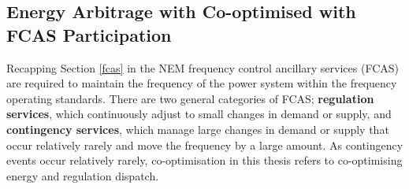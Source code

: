 \subsection{ Energy Arbitrage with Co-optimised with FCAS Participation }
Recapping Section \ref{fcas} in the NEM frequency control ancillary services (FCAS) are required to maintain the frequency of the power system within the frequency operating standards. There are two general categories of FCAS; \textbf{regulation services}, which continuously adjust to small changes in demand or supply, and \textbf{contingency services}, which manage large changes in demand or supply that occur relatively rarely and move the frequency by a large amount.
As contingency events occur relatively rarely, co-optimisation in this thesis refers to co-optimising energy and regulation dispatch.

